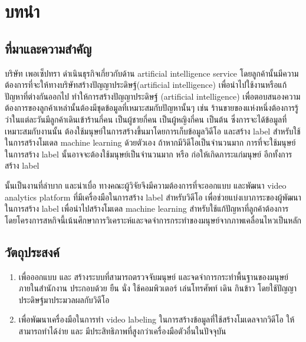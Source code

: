 \chapter{บทนำ}
\section{ที่มาและความสำคัญ}
บริษัท เพอเซ็ปทรา ดำเนินธุรกิจเกี่ยวกับด้าน artificial intelligence service โดยลูกค้านั้นมีความต้องการที่จะให้ทางบริษัทสร้างปัญญาประดิษฐ์(artificial intelligence) เพื่อนำไปใช้งานหรือแก้ปัญหาที่ต่างกันออกไป ทำให้การสร้างปัญญาประดิษฐ์ (artificial intelligence) เพื่อตอบสนองความต้องการของลูกค้าเหล่านั้นต้องมีชุดข้อมูลที่เหมาะสมกับปัญหานั้นๆ เช่น ร้านขายของแห่งหนึ่งต้องการรู้ว่าในแต่ละวันมีลูกค้าเดินเข้าร้านกี่คน เป็นผู้ชายกี่คน เป็นผู้หญิงกี่คน เป็นต้น ซึ่งการจะได้ข้อมูลที่เหมาะสมกับงานนั้น ต้องใช้มนุษย์ในการสร้างขึ้นมาโดยการเก็บข้อมูลวิดีโอ และสร้าง label สำหรับใช้ในการสร้างโมเดล machine learning ด้วยตัวเอง ถ้าหากมีวิดีโอเป็นจำนวนมาก การที่จะใช้มนุษย์ในการสร้าง label นั้นอาจจะต้องใช้มนุษย์เป็นจำนวนมาก หรือ ก่อให้เกิดภาระแก่มนุษย์ อีกทั้งการสร้าง label 

นั้นเป็นงานที่ลำบาก และน่าเบื่อ
ทางคณะผู้วิจัยจึงมีความต้องการที่จะออกแบบ และพัฒนา video analytics platform ที่มีเครื่องมือในการสร้าง label สำหรับวิดีโอ เพื่อช่วยแบ่งเบาภาระของผู้พัฒนาในการสร้าง label เพื่อนำไปสร้างโมเดล machine learning สำหรับใช้แก้ปัญหาที่ลูกค้าต้องการ โดยโครงการสหกิจนี้เน้นศึกษาการวิเคราะห์และจดจำการกระทำของมนุษย์จากภาพเคลื่อนไหวเป็นหลัก

\section{วัตถุประสงค์}
\begin{enumerate}
	\setlength\itemsep{-0.25em}
	\item เพื่อออกแบบ และ สร้างระบบที่สามารถตรวจจับมนุษย์ และจดจำการกระทำพื้นฐานของมนุษย์ภายในสำนักงาน ประกอบด้วย ยืน นั่ง ใช้คอมพิวเตอร์ เล่นโทรศัพท์ เดิน กินข้าว โดยใช้ปัญญาประดิษฐ์มาประมวลผลกับวิดีโอ
	\item เพื่อพัฒนาเครื่องมือในการทำ video labeling ในการสร้างข้อมูลที่ใช้สร้างโมเดลจากวิดีโอ ให้สามารถทำได้ง่าย และ มีประสิทธิภาพที่สูงกว่าเครื่องมือตัวอื่นในปัจจุบัน
\end{enumerate}


